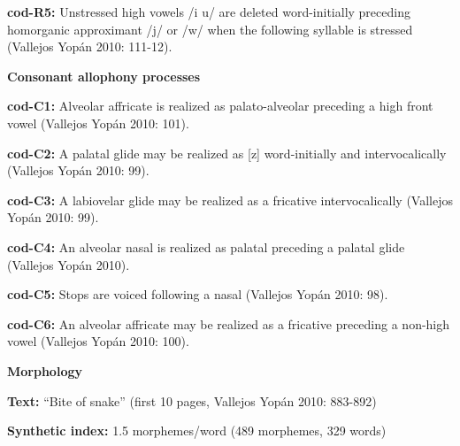 \begin{styleBody}
\textbf{cod-R5:} Unstressed high vowels /i u/ are deleted word-initially preceding homorganic approximant /j/ or /w/ when the following syllable is stressed (Vallejos Yopán 2010: 111-12).
\end{styleBody}

\begin{styleBody}
\textbf{Consonant allophony processes}
\end{styleBody}

\begin{styleBody}
\textbf{cod-C1: }Alveolar affricate is realized as palato-alveolar preceding a high front vowel (Vallejos Yopán 2010: 101).
\end{styleBody}

\begin{styleBody}
\textbf{cod-C2: }A palatal glide may be realized as [z] word-initially and intervocalically (Vallejos Yopán 2010: 99).
\end{styleBody}

\begin{styleBody}
\textbf{cod-C3: }A labiovelar glide may be realized as a fricative intervocalically (Vallejos Yopán 2010: 99).
\end{styleBody}

\begin{styleBody}
\textbf{cod-C4: }An alveolar nasal is realized as palatal preceding a palatal glide (Vallejos Yopán 2010).
\end{styleBody}

\begin{styleBody}
\textbf{cod-C5: }Stops are voiced following a nasal (Vallejos Yopán 2010: 98).
\end{styleBody}

\begin{styleBody}
\textbf{cod-C6: }An alveolar affricate may be realized as a fricative preceding a non-high vowel (Vallejos Yopán 2010: 100).
\end{styleBody}

\begin{styleBody}
\textbf{Morphology}
\end{styleBody}

\begin{styleBody}
\textbf{Text:} “Bite of snake” (first 10 pages, Vallejos Yopán 2010: 883-892)
\end{styleBody}

\begin{styleBody}
\textbf{Synthetic index: }1.5 morphemes/word (489 morphemes, 329 words)
\end{styleBody}

